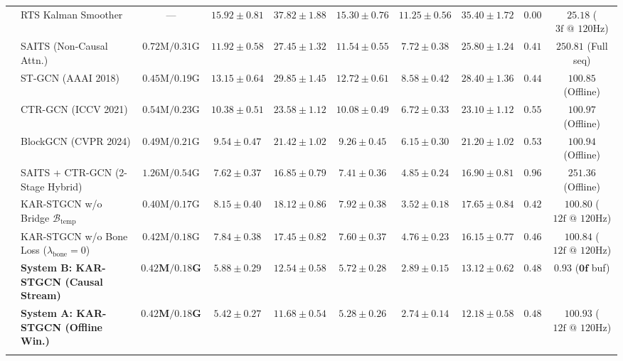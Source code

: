 \documentclass[10pt,twocolumn]{article}
\begin{document}
\begin{table}[!t]
{\begin{tabular}{llcccccccc}
& RTS Kalman Smoother & --- & $15.92 \pm 0.81$ & $37.82 \pm 1.88$ & $15.30 \pm 0.76$ & $11.25 \pm 0.56$ & $35.40 \pm 1.72$ & $0.00$ & $25.18$ ($3\text{f @ 120Hz}$) \\
& SAITS \cite{du2023saits} (Non-Causal Attn.) & $0.72\text{M} / 0.31\text{G}$ & $11.92 \pm 0.58$ & $27.45 \pm 1.32$ & $11.54 \pm 0.55$ & $7.72 \pm 0.38$ & $25.80 \pm 1.24$ & $0.41$ & $250.81$ (Full seq) \\
& ST-GCN \cite{yan2018spatial} (AAAI 2018) & $0.45\text{M} / 0.19\text{G}$ & $13.15 \pm 0.64$ & $29.85 \pm 1.45$ & $12.72 \pm 0.61$ & $8.58 \pm 0.42$ & $28.40 \pm 1.36$ & $0.44$ & $100.85$ (Offline) \\
& CTR-GCN \cite{chen2021channel} (ICCV 2021) & $0.54\text{M} / 0.23\text{G}$ & $10.38 \pm 0.51$ & $23.58 \pm 1.12$ & $10.08 \pm 0.49$ & $6.72 \pm 0.33$ & $23.10 \pm 1.12$ & $0.55$ & $100.97$ (Offline) \\
& BlockGCN \cite{zhou2024blockgcn} (CVPR 2024) & $0.49\text{M} / 0.21\text{G}$ & $9.54 \pm 0.47$ & $21.42 \pm 1.02$ & $9.26 \pm 0.45$ & $6.15 \pm 0.30$ & $21.20 \pm 1.02$ & $0.53$ & $100.94$ (Offline) \\
& SAITS + CTR-GCN (2-Stage Hybrid) & $1.26\text{M} / 0.54\text{G}$ & $7.62 \pm 0.37$ & $16.85 \pm 0.79$ & $7.41 \pm 0.36$ & $4.85 \pm 0.24$ & $16.90 \pm 0.81$ & $0.96$ & $251.36$ (Offline) \\
& KAR-STGCN w/o Bridge $\mathcal{B}_{\text{temp}}$ & $0.40\text{M} / 0.17\text{G}$ & $8.15 \pm 0.40$ & $18.12 \pm 0.86$ & $7.92 \pm 0.38$ & $3.52 \pm 0.18$ & $17.65 \pm 0.84$ & $0.42$ & $100.80$ ($12\text{f @ 120Hz}$) \\
& KAR-STGCN w/o Bone Loss ($\lambda_{\text{bone}}=0$) & $0.42\text{M} / 0.18\text{G}$ & $7.84 \pm 0.38$ & $17.45 \pm 0.82$ & $7.60 \pm 0.37$ & $4.76 \pm 0.23$ & $16.15 \pm 0.77$ & $0.46$ & $100.84$ ($12\text{f @ 120Hz}$) \\
& \textbf{System B: KAR-STGCN (Causal Stream)} & $\mathbf{0.42\text{M} / 0.18\text{G}}$ & $5.88 \pm 0.29$ & $12.54 \pm 0.58$ & $5.72 \pm 0.28$ & $2.89 \pm 0.15$ & $13.12 \pm 0.62$ & $0.48$ & $\mathbf{0.93}$ ($\mathbf{0\text{f}}$ buf) \\
& \textbf{System A: KAR-STGCN (Offline Win.)} & $\mathbf{0.42\text{M} / 0.18\text{G}}$ & $\mathbf{5.42 \pm 0.27}$ & $\mathbf{11.68 \pm 0.54}$ & $\mathbf{5.28 \pm 0.26}$ & $\mathbf{2.74 \pm 0.14}$ & $\mathbf{12.18 \pm 0.58}$ & $0.48$ & $100.93$ ($12\text{f @ 120Hz}$) \\
\midrule
{}

\end{tabular}}
\end{table}
\end{document}
